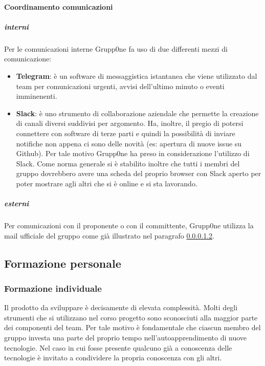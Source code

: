 \documentclass[../norme-di-progetto.tex]{subfiles}
\begin{document}
\paragraph{Coordinamento comunicazioni}
\label{par:coordinamento comunicazioni}
\subparagraph{interni}
\label{subp:interni}
Per le comunicazioni interne Grupp0ne fa uso di due differenti mezzi di comunicazione:
\begin{itemize}
	\item \textbf{Telegram}: è un software di messaggistica istantanea che viene utilizzato dal team per comunicazioni urgenti, avvisi dell'ultimo minuto o eventi imminenenti.
	\item \textbf{Slack}: è uno strumento di collaborazione aziendale che permette la creazione di canali diversi suddivisi per argomento. Ha, inoltre, il pregio di potersi connettere con software di terze parti e quindi la possibilità di inviare notifiche non appena ci sono delle novità (es: apertura di nuove issue su Github). Per tale motivo Grupp0ne ha preso in considerazione l'utilizzo di Slack. Come norma generale si è stabilito inoltre che tutti i membri del gruppo dovrebbero avere una scheda del proprio browser con Slack aperto per poter mostrare agli altri che si è online e si sta lavorando.
\end{itemize}
\subparagraph{esterni}
\label{subp:interni}
Per comunicazioni con il proponente o con il committente, Grupp0ne utilizza la mail ufficiale del gruppo come già illustrato nel paragrafo \ref{subp:interni}.
\subsection{Formazione personale}
\label{sub:formazione personale}
\subsubsection{Formazione individuale}
\label{subs:formazione individuale}
Il prodotto da sviluppare è decisamente di elevata complessità. Molti degli strumenti che si utilizzano nel corso  progetto sono sconosciuti alla maggior parte dei componenti del team. Per tale motivo è fondamentale che ciascun membro del gruppo investa una parte del proprio tempo nell'autoapprendimento di nuove tecnologie. Nel caso in cui fosse presente qualcuno già a conoscenza delle tecnologie è invitato a condividere la propria conoscenza con gli altri.
\end{document}
